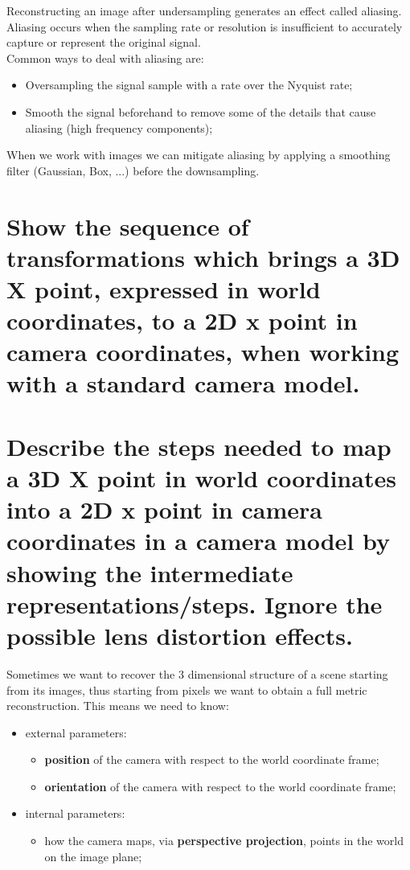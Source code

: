 \documentclass{article}
\begin{document}
Reconstructing an image after undersampling generates an effect called aliasing. Aliasing occurs when the sampling rate or resolution is insufficient to accurately capture or represent the original signal. \\

Common ways to deal with aliasing are:

\begin{itemize}
    \item Oversampling the signal sample with a rate over the Nyquist rate;
    \item Smooth the signal beforehand to remove some of the details that cause aliasing (high frequency components);
\end{itemize}

When we work with images we can mitigate aliasing by applying a smoothing filter (Gaussian, Box, ...) before the downsampling.

\newpage

\section{Show the sequence of transformations which brings a 3D X point, expressed in world coordinates, to a 2D x point in camera coordinates, when working with a standard camera model.}

\section{Describe the steps needed to map a 3D X point in world coordinates into a 2D x point in camera coordinates in a camera model by showing the intermediate representations/steps. Ignore the possible lens distortion effects.}

Sometimes we want to recover the 3 dimensional structure of a scene starting from its images, thus starting from pixels we want to obtain a full metric reconstruction. This means we need to know:

\begin{itemize}
    \item external parameters:
    \begin{itemize}
        \item \textbf{position} of the camera with respect to the world coordinate frame;
        \item \textbf{orientation} of the camera with respect to the world coordinate frame;
    \end{itemize}
    \item internal parameters:
    \begin{itemize}
        \item how the camera maps, via \textbf{perspective projection}, points in the world on the image plane;
    \end{itemize}
\end{itemize}
\end{document}
